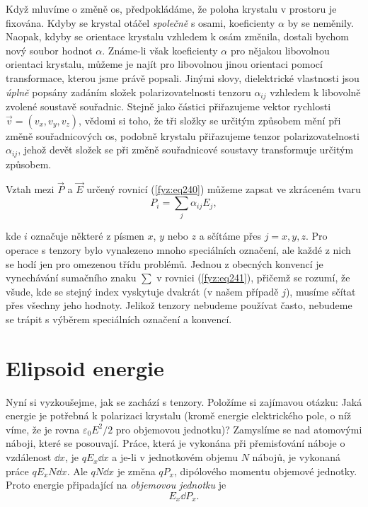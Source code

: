     Když mluvíme o změně os, předpokládáme, že poloha krystalu v prostoru je fixována. Kdyby se
    krystal otáčel \emph{společně} s osami, koeficienty \(\alpha\) by se neměnily. Naopak, kdyby se
    orientace krystalu vzhledem k osám změnila, dostali bychom nový soubor hodnot \(\alpha\).
    Známe-li však koeficienty \(\alpha\) pro nějakou libovolnou orientaci krystalu, můžeme je najít
    pro libovolnou jinou orientaci pomocí transformace, kterou jsme právě popsali. Jinými slovy,
    dielektrické vlastnosti jsou \emph{úplně} popsány zadáním složek polarizovatelnosti tenzoru
    \(\alpha_{ij}\) vzhledem k libovolně zvolené soustavě souřadnic. Stejně jako částici přiřazujeme
    vektor rychlosti \(\vec{v} = (v_x, v_y, v_z)\), vědomi si toho, že tři složky se určitým
    způsobem mění při změně souřadnicových os, podobně krystalu přiřazujeme tenzor
    polarizovatelnosti \(\alpha_{ij}\), jehož devět složek se při změně souřadnicové soustavy
    transformuje určitým způsobem.

    Vztah mezi \(\vec{P}\) a \(\vec{E}\) určený rovnicí (\ref{fyz:eq240}) můžeme zapsat ve zkráceném
    tvaru
    \begin{equation}\label{fyz:eq241}
      P_i = \sum_j\alpha_{ij}E_j,
    \end{equation}

    kde \(i\) označuje některé z písmen \(x\), \(y\) nebo \(z\) a sčítáme přes \(j = x, y, z\). Pro
    operace s tenzory bylo vynalezeno mnoho speciálních označení, ale každé z nich se hodí jen pro
    omezenou třídu problémů. Jednou z obecných konvencí je vynechávání sumačního znaku \(\sum\) v
    rovnici (\ref{fyz:eq241}), přičemž se rozumí, že všude, kde se stejný index vyskytuje dvakrát (v
    našem případě \(j\)), musíme sčítat přes všechny jeho hodnoty. Jelikož tenzory nebudeme používat
    často, nebudeme se trápit s výběrem speciálních označení a konvencí.

  \section{Elipsoid energie}\label{fyz:IIchapXXXIsecIII}
    Nyní si vyzkoušejme, jak se zachází s tenzory. Položíme si zajímavou otázku: Jaká energie je
    potřebná k polarizaci krystalu (kromě energie elektrického pole, o níž víme, že je rovna
    \(\varepsilon_0E^2/2\) pro objemovou jednotku)? Zamyslíme se nad atomovými náboji, které se
    posouvají. Práce, která je vykonána při přemisťování náboje o vzdálenost \(\dd{x}\), je
    \(qE_x\dd{x}\) a je-li v jednotkovém objemu \(N\) nábojů, je vykonaná práce  \(qE_xN\dd{x}\).
    Ale  \(qN\dd{x}\) je změna \(qP_x\), dipólového momentu objemové jednotky. Proto energie
    připadající na \emph{objemovou jednotku} je
    \begin{equation*}
      E_x\dd{P_x}.
    \end{equation*}


